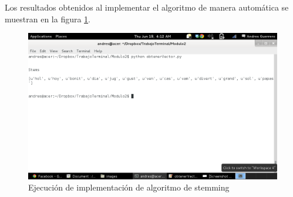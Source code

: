 Los resultados obtenidos al implementar el algoritmo de manera autom\'atica se muestran en la figura \ref{stemm}.
\begin{figure}
	\begin{center}
		\includegraphics[scale=.4]{images/stemm}
	\end{center}
	 \caption{Ejecuci\'on de implementaci\'on de algoritmo de stemming}
	 \label{stemm}
\end{figure}
